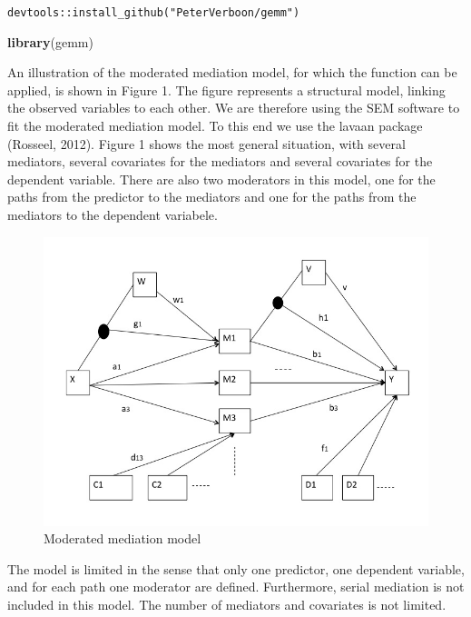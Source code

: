 \documentclass[man,floatsintext]{apa6}
\newenvironment{Shaded}{\begin{snugshade}}{\end{snugshade}}
\newcommand{\KeywordTok}[1]{\textcolor[rgb]{0.13,0.29,0.53}{\textbf{#1}}}
\newcommand{\NormalTok}[1]{#1}
\theoremstyle{definition}
\theoremstyle{definition}
\theoremstyle{definition}
\theoremstyle{remark}
\begin{document}
\texttt{devtools::install\_github("PeterVerboon/gemm")}

\begin{Shaded}
\begin{Highlighting}[]
\KeywordTok{library}\NormalTok{(gemm)}
\end{Highlighting}
\end{Shaded}

An illustration of the moderated mediation model, for which the function
can be applied, is shown in Figure 1. The figure represents a structural
model, linking the observed variables to each other. We are therefore
using the SEM software to fit the moderated mediation model. To this end
we use the lavaan package (Rosseel, 2012). Figure 1 shows the most
general situation, with several mediators, several covariates for the
mediators and several covariates for the dependent variable. There are
also two moderators in this model, one for the paths from the predictor
to the mediators and one for the paths from the mediators to the
dependent variabele.

\begin{figure}
\centering
\includegraphics{Figure ModMed model.jpg}
\caption{Moderated mediation model}
\end{figure}

The model is limited in the sense that only one predictor, one dependent
variable, and for each path one moderator are defined. Furthermore,
serial mediation is not included in this model. The number of mediators
and covariates is not limited.
\end{document}
